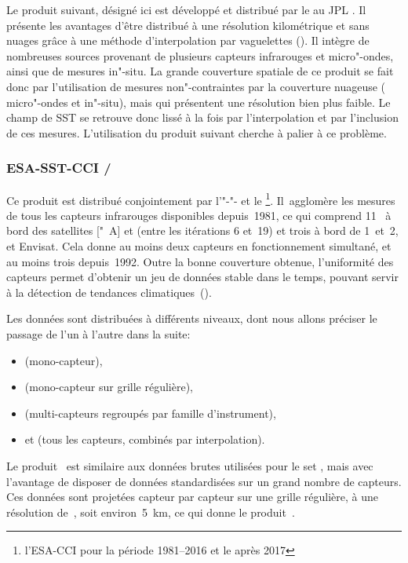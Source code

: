 Le produit suivant, désigné ici  est développé et distribué par le  au JPL  .
Il présente les avantages d'être distribué à une résolution kilométrique et sans nuages grâce à une méthode d'interpolation par vaguelettes (\cite{chin_2017}).
Il intègre de nombreuses sources provenant de plusieurs capteurs infrarouges et micro"-ondes, ainsi que de mesures in"-situ.
La grande couverture spatiale de ce produit se fait donc par l'utilisation de mesures non"-contraintes par la couverture nuageuse ( micro"-ondes et in"-situ), mais qui présentent une résolution bien plus faible.
Le champ de SST se retrouve donc lissé à la fois par l'interpolation et par l'inclusion de ces mesures.
L'utilisation du produit suivant cherche à palier à ce problème.

\subsubsection{ESA-SST-CCI / }

Ce produit est distribué conjointement par l'"-"- et le \footnote{%
  l'ESA-CCI pour la période 1981--2016 et le  après 2017}.
Il~agglomère les mesures de tous les capteurs infrarouges disponibles depuis~1981, ce qui comprend 11~ à bord des satellites ["~A] et  (entre les itérations 6 et~19) et trois  à bord de  1~et~2, et Envisat. 
Cela donne au moins deux capteurs en fonctionnement simultané, et au moins trois depuis~1992.
Outre la bonne couverture obtenue, l'uniformité des capteurs permet d'obtenir un jeu de données stable dans le temps, pouvant servir à la détection de tendances climatiques~(\cite{merchant_2019}).

Les données sont distribuées à différents niveaux, dont nous allons préciser le passage de l'un à l'autre dans la suite:
\begin{itemize}
  \item {} (mono-capteur),
  \item {} (mono-capteur sur grille régulière),
  \item {} (multi-capteurs regroupés par famille d'instrument),
  \item et  (tous les capteurs, combinés par interpolation).
\end{itemize}

Le produit~ est similaire aux données brutes utilisées pour le set , mais avec l'avantage de disposer de données standardisées sur un grand nombre de capteurs.
Ces données sont projetées capteur par capteur sur une grille régulière, à une résolution de~, soit environ~\qty{5}{\km}, ce qui donne le produit~.

